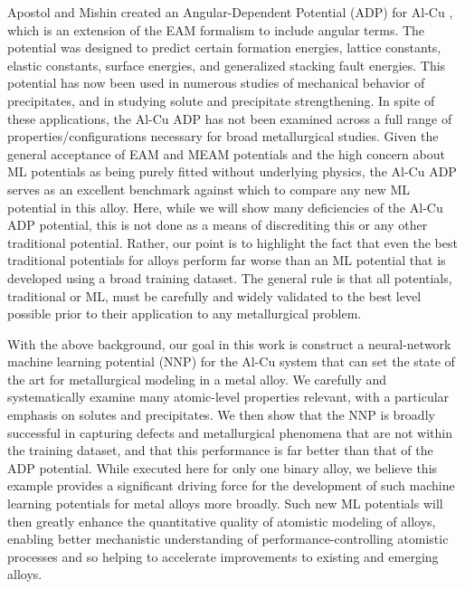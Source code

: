\documentclass{article}
\begin{document}
Apostol and Mishin created an Angular-Dependent Potential (ADP) for Al-Cu \cite{Apostol2011}, which is an extension of the EAM formalism to include angular terms.  The potential was designed to predict certain formation energies, lattice constants, elastic constants, surface energies, and generalized stacking fault energies.  This potential has now been used in numerous studies of mechanical behavior of precipitates, and in studying solute and precipitate strengthening\cite{Singh2013AnAlloy}\cite{Esteban-Manzanares2019}\cite{Wu2020AtomisticAlloys}. In spite of these applications, the Al-Cu ADP has not been examined across a full range of properties/configurations necessary for broad metallurgical studies.  Given the general acceptance of EAM and MEAM potentials and the high concern about ML potentials as being purely fitted without underlying physics, the Al-Cu ADP serves as an excellent benchmark against which to compare any new ML potential in this alloy.  Here, while we will show many deficiencies of the Al-Cu ADP potential, this is not done as a means of discrediting this or any other traditional potential.  Rather, our point is to highlight the fact that even the best traditional potentials for alloys perform far worse than an ML potential that is developed using a broad training dataset.  The general rule is that all potentials, traditional or ML, must be carefully and widely validated to the best level possible prior to their application to any metallurgical problem.

With the above background, our goal in this work is construct a neural-network machine learning potential (NNP) for the Al-Cu system that can set the state of the art for metallurgical modeling in a metal alloy.  We carefully and systematically examine many atomic-level properties relevant, with a particular emphasis on solutes and precipitates.  We then show that the NNP is broadly successful in capturing defects and metallurgical phenomena that are not within the training dataset, and that this performance is far better than that of the ADP potential.  While executed here for only one binary alloy, we believe this example provides a significant driving force for the development of such machine learning potentials for metal alloys more broadly.  Such new ML potentials will then greatly enhance the quantitative quality of atomistic modeling of alloys, enabling better mechanistic understanding of performance-controlling atomistic processes and so helping to accelerate improvements to existing and emerging alloys. 
\end{document}
